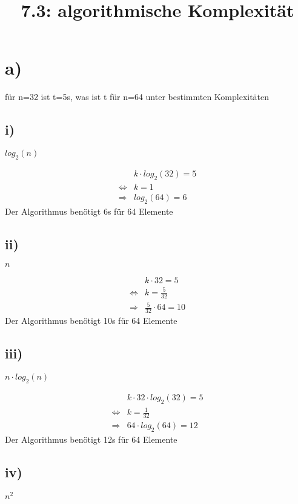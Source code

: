 \documentclass[12pt, a4paper, reqno]{amsart}
\begin{document}
    \title{7.3: algorithmische Komplexität}
    \maketitle
    
    \section*{a)}
    für n=32 ist t=5s, was ist t für n=64 unter bestimmten Komplexitäten
    
    \subsection*{i)} $log_2(n)$
    
    \begin{align}
        &k\cdot log_2(32) = 5\\
        \Leftrightarrow & k = 1 \\
        \Rightarrow & log_2(64) = 6
    \end{align}
    Der Algorithmus benötigt 6s für 64 Elemente
    
    \subsection*{ii)} $n$
    
    \begin{align}
    &k\cdot 32 = 5\\
    \Leftrightarrow & k = \frac 5 {32} \\
    \Rightarrow & \frac 5 {32}\cdot 64 = 10
    \end{align}
    Der Algorithmus benötigt 10s für 64 Elemente
    
    
    \subsection*{iii)} $n\cdot log_2(n)$
    
    \begin{align}
    &k\cdot 32 \cdot log_2(32) = 5\\
    \Leftrightarrow & k = \frac 1 {32} \\
    \Rightarrow & 64\cdot log_2(64) = 12
    \end{align}
    Der Algorithmus benötigt 12s für 64 Elemente
    
    
    \subsection*{iv)} $n^2$
    
\end{document}
